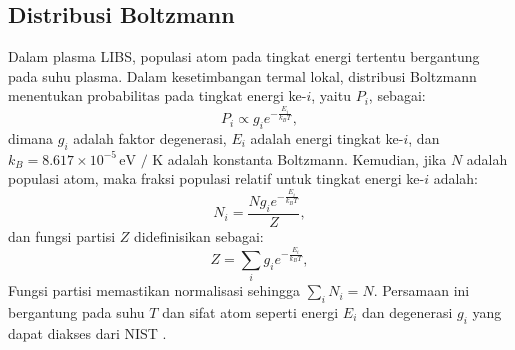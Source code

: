 \subsection{Distribusi Boltzmann}
Dalam plasma LIBS, populasi atom pada tingkat energi tertentu bergantung pada suhu plasma. Dalam kesetimbangan termal lokal, distribusi Boltzmann menentukan probabilitas pada tingkat energi ke-\( i \), yaitu \( P_i \), sebagai:
\begin{equation}
P_i \propto g_i e^{-\frac{E_i}{k_B T}}, \label{eq:boltzmann_propto}
\end{equation}
dimana \( g_i \) adalah faktor degenerasi, \( E_i \) adalah energi tingkat ke-\( i \), dan \( k_B = 8.617 \times 10^{-5} \, \text{eV / K} \) adalah konstanta Boltzmann. Kemudian, jika \( N \) adalah populasi atom, maka fraksi populasi relatif untuk tingkat energi ke-\( i \) adalah:
\begin{equation}
N_i = \frac{N g_i e^{-\frac{E_i}{k_B T}}}{Z}, \label{eq:boltzmann1}
\end{equation}
dan fungsi partisi \( Z \) didefinisikan sebagai:
\begin{equation}
Z = \sum_i g_i e^{-\frac{E_i}{k_B T}}, \label{eq:partition}
\end{equation}
Fungsi partisi memastikan normalisasi sehingga \( \sum_i N_i = N \). Persamaan ini bergantung pada suhu \( T \) dan sifat atom seperti energi \( E_i \) dan degenerasi \( g_i \) yang dapat diakses dari NIST \citep{Pathria2011,Rybicki1985}.


